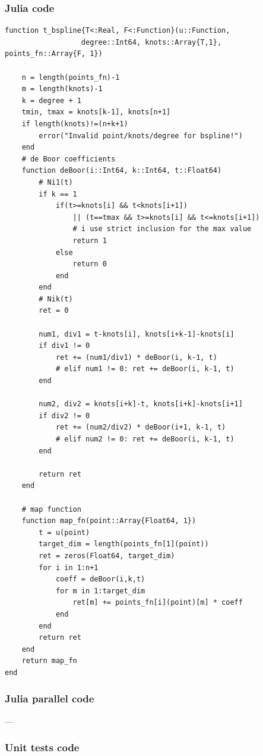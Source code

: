 \documentclass[a4paper,11pt]{article}
\begin{document}
\subsubsection{Julia code}

\begin{verbatim}
function t_bspline{T<:Real, F<:Function}(u::Function, 
                  degree::Int64, knots::Array{T,1}, points_fn::Array{F, 1})
   
    n = length(points_fn)-1
    m = length(knots)-1
    k = degree + 1
    tmin, tmax = knots[k-1], knots[n+1]
    if length(knots)!=(n+k+1) 
        error("Invalid point/knots/degree for bspline!") 
    end
    # de Boor coefficients
    function deBoor(i::Int64, k::Int64, t::Float64)
        # Ni1(t)
        if k == 1 
            if(t>=knots[i] && t<knots[i+1]) 
                || (t==tmax && t>=knots[i] && t<=knots[i+1])
                # i use strict inclusion for the max value
                return 1
            else
                return 0
            end
        end
        # Nik(t)
        ret = 0
        
        num1, div1 = t-knots[i], knots[i+k-1]-knots[i]  
        if div1 != 0 
            ret += (num1/div1) * deBoor(i, k-1, t)
            # elif num1 != 0: ret += deBoor(i, k-1, t)
        end
        
        num2, div2 = knots[i+k]-t, knots[i+k]-knots[i+1]
        if div2 != 0  
            ret += (num2/div2) * deBoor(i+1, k-1, t)
            # elif num2 != 0: ret += deBoor(i, k-1, t)
        end
           
        return ret
    end
    
    # map function
    function map_fn(point::Array{Float64, 1})
        t = u(point)
        target_dim = length(points_fn[1](point))
        ret = zeros(Float64, target_dim)
        for i in 1:n+1
            coeff = deBoor(i,k,t) 
            for m in 1:target_dim
                ret[m] += points_fn[i](point)[m] * coeff
            end
        end
        return ret
    end
    return map_fn
end
\end{verbatim}

\subsubsection{Julia parallel code}
---

\subsubsection{Unit tests code}
\end{document}
